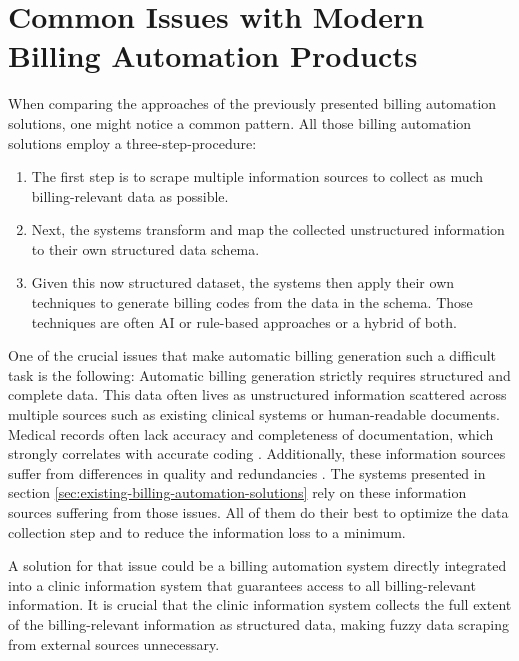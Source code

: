 \section{Common Issues with Modern Billing Automation Products}\label{sec:common-issues-with-modern-billing-automation-products}
When comparing the approaches of the previously presented billing automation solutions, one might notice a common pattern.
All those billing automation solutions employ a three-step-procedure:
\begin{enumerate}
    \item The first step is to scrape multiple information sources to collect as much billing-relevant data as possible.
    \item Next, the systems transform and map the collected unstructured information to their own structured data schema.
    \item Given this now structured dataset, the systems then apply their own techniques to generate billing codes from the data in the schema.
    Those techniques are often AI or rule-based approaches or a hybrid of both.
\end{enumerate}

One of the crucial issues that make automatic billing generation such a difficult task is the following:
Automatic billing generation strictly requires structured and complete data. \addcite
This data often lives as unstructured information scattered across multiple sources such as existing clinical systems or human-readable documents.
Medical records often lack accuracy and completeness of documentation, which strongly correlates with accurate coding \cite{Farhan2005Documentation}.
Additionally, these information sources suffer from differences in quality and redundancies \cite{Scheurwegs2017Selecting}.
The systems presented in section \ref{sec:existing-billing-automation-solutions} rely on these information sources suffering from those issues.
All of them do their best to optimize the data collection step and to reduce the information loss to a minimum.

A solution for that issue could be a billing automation system directly integrated into a clinic information system that guarantees access to all billing-relevant information.
It is crucial that the clinic information system collects the full extent of the billing-relevant information as structured data, making fuzzy data scraping from external sources unnecessary.

